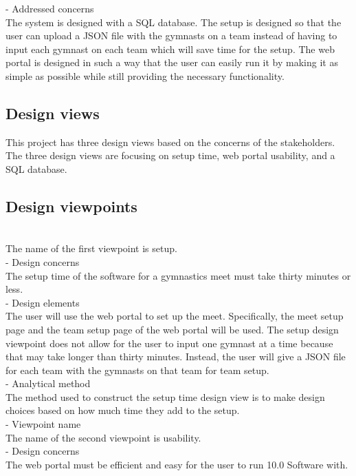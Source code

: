 \documentclass[letterpaper,10pt,draftclsnofoot,onecolumn,]{article}
\begin{document}
- Addressed concerns\\
The system is designed with a SQL database. The setup is designed so that the user can upload a JSON file with the gymnasts on a team instead of having to input each gymnast on each team which will save time for the setup. The web portal is designed in such a way that the user can easily run it by making it as simple as possible while still providing the necessary functionality.

\subsection{Design views}
This project has three design views based on the concerns of the stakeholders. The three design views are focusing on setup time, web portal usability, and a SQL database.

\subsection{Design viewpoints}
\\
The name of the first viewpoint is setup.\\

- Design concerns\\
The setup time of the software for a gymnastics meet must take thirty minutes or less.\\

- Design elements\\
The user will use the web portal to set up the meet. Specifically, the meet setup page and the team setup page of the web portal will be used. The setup design viewpoint does not allow for the user to input one gymnast at a time because that may take longer than thirty minutes. Instead, the user will give a JSON file for each team with the gymnasts on that team for team setup.\\

- Analytical method\\
The method used to construct the setup time design view is to make design choices based on how much time they add to the setup.\\

- Viewpoint name\\
The name of the second viewpoint is usability.\\

- Design concerns\\
The web portal must be efficient and easy for the user to run 10.0 Software with.\\
\end{document}
